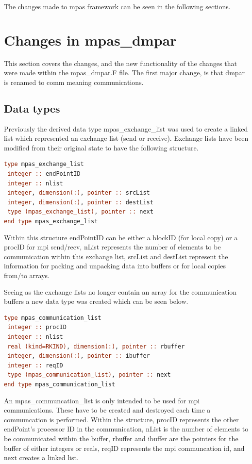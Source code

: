 \documentclass[11pt]{report}
\begin{document}
The changes made to mpas framework can be seen in the following sections.

\section{Changes in mpas\_dmpar}
This section covers the changes, and the new functionality of the changes that
were made within the mpas\_dmpar.F file. The first major change, is that dmpar
is renamed to comm meaning communications. 

\subsection{Data types}
Previously the derived data type mpas\_exchange\_list was used to create a linked list which represented an exchange list (send or receive). Exchange lists have been modified from their original state to have the following structure.
\begin{lstlisting}[language=fortran,escapechar=@,frame=single]
type mpas_exchange_list
 integer :: endPointID
 integer :: nlist
 integer, dimension(:), pointer :: srcList
 integer, dimension(:), pointer :: destList
 type (mpas_exchange_list), pointer :: next
end type mpas_exchange_list
\end{lstlisting}

Within this structure endPointID can be either a blockID (for local copy) or a procID for mpi send/recv, nList represents the number of elements to be communication within this exchange list, srcList and destList represent the information for packing and unpacking data into buffers or for local copies from/to arrays.

Seeing as the exchange lists no longer contain an array for the communication buffers a new data type was created which can be seen below.

\begin{lstlisting}[language=fortran,escapechar=@,frame=single]
type mpas_communication_list
 integer :: procID
 integer :: nlist
 real (kind=RKIND), dimension(:), pointer :: rbuffer
 integer, dimension(:), pointer :: ibuffer
 integer :: reqID
 type (mpas_communication_list), pointer :: next
end type mpas_communication_list
\end{lstlisting}

An mpas\_communcation\_list is only intended to be used for mpi communications. These have to be created and destroyed each time a communcation is performed. Within the structure, procID represents the other endPoint's processor ID in the communication, nList is the number of elements to be communicated within the buffer, rbuffer and ibuffer are the pointers for the buffer of either integers or reals, reqID represents the mpi communcation id, and next creates a linked list.
\end{document}
